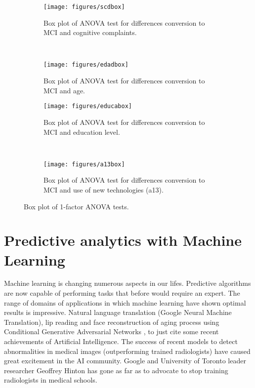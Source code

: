 \documentclass[11pt]{article}
\theoremstyle{definition}
\theoremstyle{remark}
\begin{document}
\begin{figure}[H]
    \centering
    \begin{subfigure}[t]{0.45\textwidth}
        \centering
        \texttt{[image: figures/scdbox]}
        \caption{Box plot of ANOVA test for differences conversion to MCI and cognitive complaints.}
    \end{subfigure}
    ~ 
    \begin{subfigure}[t]{0.45\textwidth}
        \centering
        \texttt{[image: figures/edadbox]}
        \caption{Box plot of ANOVA test for differences conversion to MCI and age.}
    \end{subfigure}%
    
     \begin{subfigure}[t]{0.45\textwidth}
        \centering
        \texttt{[image: figures/educabox]}
        \caption{Box plot of ANOVA test for differences conversion to MCI and education level.}
    \end{subfigure}
    ~ 
    \begin{subfigure}[t]{0.45\textwidth}
        \centering
        \texttt{[image: figures/a13box]}
        \caption{Box plot of ANOVA test for differences conversion to MCI and use of new technologies (a13).}
    \end{subfigure}%
    \caption{Box plot of 1-factor ANOVA tests.} \label{fig:anovabox}
\end{figure}

\newpage
\section{Predictive analytics with Machine Learning} 
\label{se:mod}

Machine learning is changing numerous aspects in our lifes. Predictive algorithms are now capable of performing tasks that before would require an expert. The range of domains of applications in which machine learning have shown optimal results is impressive. Natural language translation (Google Neural Machine Translation), lip reading \cite{suwajanakorn2017synthesizing} and face  reconstruction of aging process using Conditional Generative Adversarial Networks \cite{antipov2017face}, to just cite some recent achievements of Artificial Intelligence.
The success of recent models to detect abnormalities in medical images (outperforming trained radiologists) have caused  great excitement in the AI community. Google and University of Toronto leader researcher Geoffrey Hinton has gone as far as to advocate to stop training radiologists in medical schools.
\end{document}
